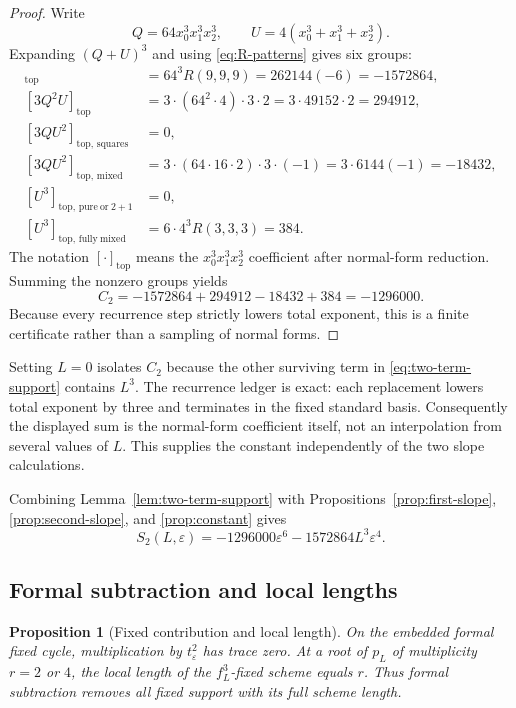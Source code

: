 \documentclass[11pt]{article}
\newtheorem{proposition}[theorem]{Proposition}
\theoremstyle{definition}
\begin{document}
{\begin{proof}
Write
\[
Q=64x_0^3x_1^3x_2^3,
\qquad
U=4(x_0^3+x_1^3+x_2^3).
\]
Expanding $(Q+U)^3$ and using \eqref{eq:R-patterns} gives six groups:
\begin{align*}
[Q^3]_{\mathrm{top}}
&=64^3R(9,9,9)=262144(-6)=-1572864,\\
[3Q^2U]_{\mathrm{top}}
&=3\cdot(64^2\cdot4)\cdot3\cdot2
=3\cdot49152\cdot2=294912,\\
[3QU^2]_{\mathrm{top},\,\mathrm{squares}}
&=0,\\
[3QU^2]_{\mathrm{top},\,\mathrm{mixed}}
&=3\cdot(64\cdot16\cdot2)\cdot3\cdot(-1)
=3\cdot6144(-1)=-18432,\\
[U^3]_{\mathrm{top},\,\mathrm{pure\ or}\ 2+1}
&=0,\\
[U^3]_{\mathrm{top},\,\mathrm{fully\ mixed}}
&=6\cdot4^3R(3,3,3)=384.
\end{align*}
The notation $[\cdot]_{\mathrm{top}}$ means the $x_0^3x_1^3x_2^3$ coefficient after normal-form reduction. Summing the nonzero groups yields
\[
C_2=-1572864+294912-18432+384=-1296000.
\]
Because every recurrence step strictly lowers total exponent, this is a finite certificate rather than a sampling of normal forms.
\end{proof}

Setting $L=0$ isolates $C_2$ because the other surviving term in \eqref{eq:two-term-support} contains $L^3$. The recurrence ledger is exact: each replacement lowers total exponent by three and terminates in the fixed standard basis. Consequently the displayed sum is the normal-form coefficient itself, not an interpolation from several values of $L$. This supplies the constant independently of the two slope calculations.

Combining Lemma~\ref{lem:two-term-support} with Propositions~\ref{prop:first-slope}, \ref{prop:second-slope}, and \ref{prop:constant} gives
\begin{equation}
S_2(L,\varepsilon)
=-1296000\varepsilon^6-1572864L^3\varepsilon^4.
\label{eq:deformed-moment-final}
\end{equation}

\subsection{Formal subtraction and local lengths}

\begin{proposition}[Fixed contribution and local length]
\label{prop:formal-subtraction}
On the embedded formal fixed cycle, multiplication by $t_\varepsilon^2$ has trace zero. At a root of $p_L$ of multiplicity $r=2$ or $4$, the local length of the $f_L^3$-fixed scheme equals $r$. Thus formal subtraction removes all fixed support with its full scheme length.
\end{proposition}

}
\end{document}
